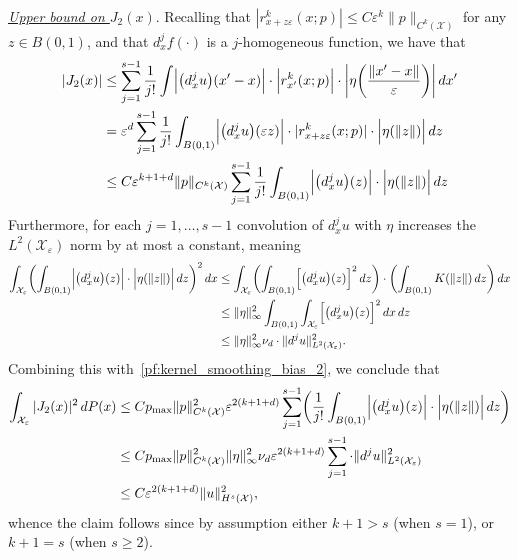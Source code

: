 \documentclass{article}
\newcommand{\1}{\mathbf{1}}
\newcommand{\Leb}{L}
\newcommand{\mc}[1]{\mathcal{#1}}
\theoremstyle{definition}
\theoremstyle{remark}
\begin{document}
\underline{\textit{Upper bound on $J_2(x)$}}.
Recalling that $|r_{x + z\varepsilon}^{k}(x; p)| \leq C\varepsilon^{k}\|p\|_{C^{k}(\mc{X})}$ for any $z \in B(0,1)$, and that $d_x^jf(\cdot)$ is a $j$-homogeneous function, we have that
\begin{align}
|J_2(x)| & \leq \sum_{j = 1}^{s - 1} \frac{1}{j!}\int \Bigl|\bigl(d_x^{j}u\bigr)(x' - x)\Bigr| \cdot \Bigl|r_{x'}^{k}(x;p)\Bigr| \cdot \biggl|\eta\biggl(\frac{\|x' - x\|}{\varepsilon}\biggr)\biggr| \,dx' \nonumber \\
& = \varepsilon^{d} \sum_{j = 1}^{s - 1} \frac{1}{j!}\int_{B(0,1)} \Bigl|\bigl(d_x^{j}u\bigr)(\varepsilon z)\Bigr| \cdot |r_{x + z\varepsilon}^{k}(x;p)| \cdot \Bigl|\eta(\|z\|)\Bigr| \,dz \nonumber \\
& \leq C\varepsilon^{k + 1 + d}\|p\|_{C^{k}(\mc{X})} \sum_{j = 1}^{s - 1} \frac{1}{j!} \int_{B(0,1)} \Bigl|\bigl(d_x^{j}u\bigr)(z)\Bigr| \cdot \Bigl|\eta(\|z\|)\Bigr| \,dz \label{pf:kernel_smoothing_bias_2}
\end{align}
Furthermore, for each $j = 1,\ldots,s - 1$ convolution of $d_x^ju$ with $\eta$ increases the $\Leb^2(\mc{X}_{\varepsilon})$ norm by at most a constant, meaning 
\begin{equation}
\label{pf:kernel_smoothing_bias_3}
\begin{aligned}
\int_{\mc{X}_{\varepsilon}} \biggl(\int_{B(0,1)} \Bigl|\bigl(d_x^{j}u\bigr)(z)\Bigr| \cdot \Bigl|\eta(\|z\|)\Bigr| \,dz\biggr)^2 \,dx & \leq \int_{\mc{X}_{\varepsilon}} \biggl(\int_{B(0,1)} \Bigl[\bigl(d_x^ju\bigr)(z)\Bigr]^2 \,dz \biggr) \cdot \biggl(\int_{B(0,1)} K(\|z\|) \,dz \biggr) \,dx \\
& \leq \|\eta\|_{\infty}^2  \int_{B(0,1)} \int_{\mc{X}_{\varepsilon}} \Bigl[\bigl(d_x^ju\bigr)(z)\Bigr]^2 \,dx \,dz \\
& \leq \|\eta\|_{\infty}^2 \nu_d \cdot \|d^ju\|_{\Leb^2(\mc{X_{\varepsilon}})}^2.
\end{aligned}
\end{equation}
Combining this with~\eqref{pf:kernel_smoothing_bias_2}, we conclude that
\begin{align*}
\int_{\mc{X}_{\varepsilon}} |J_2(x)|^2 \,dP(x) & \leq C p_{\max} \|p\|_{C^{k}(\mc{X})}^2 \varepsilon^{2(k + 1 + d)} \sum_{j = 1}^{s - 1} \biggl(\frac{1}{j!} \int_{B(0,1)} \Bigl|\bigl(d_x^{j}u\bigr)(z)\Bigr| \cdot \Bigl|\eta(\|z\|)\Bigr| \,dz\biggr) \\
& \leq  C p_{\max} \|p\|_{C^{k}(\mc{X})}^2 \|\eta\|_{\infty}^2 \nu_d \varepsilon^{2(k + 1 + d)} \sum_{j = 1}^{s - 1} \cdot \|d^ju\|_{\Leb^2(\mc{X_{\varepsilon}})}^2 \\
& \leq C \varepsilon^{2(k + 1 + d)} \|u\|_{H^s(\mc{X})}^2,
\end{align*}
whence the claim follows since by assumption either $k + 1 > s$ (when $s = 1$), or $k + 1 = s$ (when $s \geq 2$).
\end{document}

